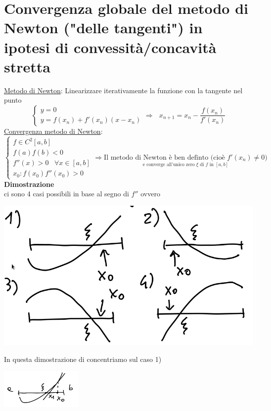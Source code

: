 \section{Convergenza globale del metodo di Newton ("delle tangenti") in ipotesi di convessità/concavità stretta}
\underline{Metodo di Newton}: Linearizzare iterativamente la funzione con la tangente nel punto
\[
\begin{cases}
	y = 0 \\
	y = f(x_n) + f'(x_n)(x-x_n) 
\end{cases}
\Rightarrow \,\,\,\,x_{n+1} = x_n - \frac{f(x_n)}{f'(x_n)}
\]
\underline{Convergenza metodo di Newton}:\\
\[
\begin{cases}
	f\in C^2[a,b]\\
	f(a)f(b)<0\\
	f''(x)>0 \,\,\,\,\, \forall x\in [a,b]\\
	x_0 : f(x_0)f''(x_0)>0
\end{cases}
\Rightarrow \underset{\text{e converge all'unico zero $\xi$ di $f$ in $[a,b]$}}{\text{Il metodo di Newton è ben definto (cioè $f'(x_n)\ne 0$)}}
\]
\textbf{Dimostrazione}\\
ci sono 4 casi possibili in base al segno di $f''$ ovvero
\begin{center}
	\includegraphics[scale=0.35]{pagina11_1.png}
\end{center}
In questa dimostrazione di concentriamo sul caso 1)\\
\begin{center}
	\includegraphics[width=0.3\textwidth]{pagina12_2.PNG} 
\end{center}
